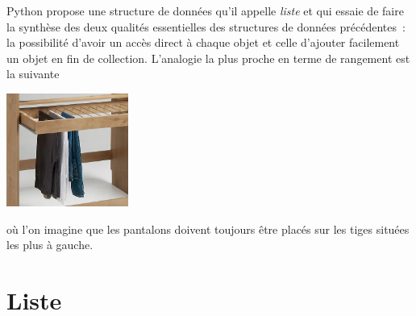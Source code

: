 \documentclass{magnolia}
\begin{document}
Python propose une structure de données qu'il appelle \emph{liste} et qui essaie de faire la synthèse
des deux qualités essentielles des structures de données précédentes~: la possibilité d'avoir un
accès direct à chaque objet et celle d'ajouter facilement un objet en fin de collection. L'analogie la plus
proche en terme de rangement est la suivante
\begin{center}
\includegraphics[width=0.3\textwidth]{../../Commun/Images/python-cours-jeans-tabdyn}
\end{center}
où l'on imagine que les pantalons doivent toujours être placés sur les tiges situées les plus à gauche.



\section{Liste}
\end{document}
